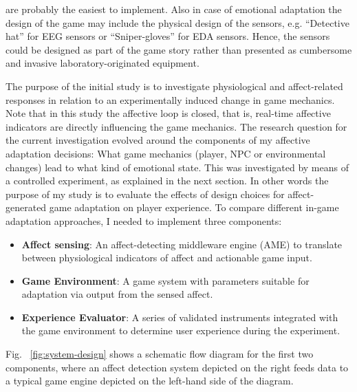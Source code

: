 are probably the easiest to implement. Also in case of emotional adaptation the design of the game may include the physical design of the sensors, e.g. “Detective hat” for EEG sensors or “Sniper-gloves” for EDA sensors. Hence, the sensors could be designed as part of the game story rather than presented as cumbersome and invasive laboratory-originated equipment.

The purpose of the initial study is to investigate physiological and affect-related responses in relation to an experimentally induced change in game mechanics. Note that in this study the affective loop is closed, that is, real-time affective indicators are directly influencing the game mechanics. The research question for the current investigation evolved around the components of my affective adaptation decisions: What game mechanics (player, NPC or environmental changes) lead to what kind of emotional state. This was investigated by means of a controlled experiment, as explained in the next section. In other words the purpose of my study is to evaluate the effects of design choices for affect-generated game adaptation on player experience. To compare different in-game adaptation approaches, I needed to implement three components:

\begin{itemize}
\item \textbf{Affect sensing}: An affect-detecting middleware engine (AME) to translate between physiological indicators of affect and actionable game input.
\item \textbf{Game Environment}: A game system with parameters suitable for adaptation via output from the sensed affect.
\item \textbf{Experience Evaluator}: A series of validated instruments integrated with the game environment to determine user experience during the experiment.
\end{itemize}

Fig. ~\ref{fig:system-design} shows a schematic flow diagram for the first two components, where an affect detection system depicted on the right feeds data to a typical game engine depicted on the left-hand side of the diagram.

